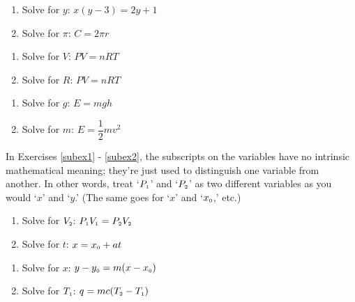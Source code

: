 \documentclass[11pt]{article}
\theoremstyle{definition}  %
\newcounter{HW}
\begin{document}
\begin{multicols}{2}
\begin{enumerate}
\setcounter{enumi}{\value{HW}}
\item Solve for $y$:  $x(y-3) = 2y+1$
\item Solve for $\pi$:  $C = 2\pi r$


\setcounter{HW}{\value{enumi}}
\end{enumerate}
\end{multicols}


\begin{multicols}{2}
\begin{enumerate}
\setcounter{enumi}{\value{HW}}
\item Solve for $V$:   $PV = nRT$
\item Solve for $R$:  $PV = nRT$
\setcounter{HW}{\value{enumi}}
\end{enumerate}
\end{multicols}

\begin{multicols}{2}
\begin{enumerate}
\setcounter{enumi}{\value{HW}}
\item Solve for $g$:   $E = mgh$ 
\item Solve for $m$:  $E = \dfrac{1}{2} mv^2$
\setcounter{HW}{\value{enumi}}
\end{enumerate}
\end{multicols}

In Exercises \ref{subex1} - \ref{subex2}, the subscripts on the variables have no intrinsic mathematical meaning; they're just used to distinguish one variable from another.  In other words, treat `$P_{\text{\tiny $1$}}$' and `$P_{\text{\tiny $2$}}$'  as two different variables as you would `$x$' and `$y$.'  (The same goes for `$x$' and `$x_{\text{\tiny $0$}}$,'  etc.)

\begin{multicols}{2}
\begin{enumerate}
\setcounter{enumi}{\value{HW}}
\item Solve for $V_{\text{\tiny $2$}}$:  $P_{\text{\tiny $1$}}V_{\text{\tiny $1$}} = P_{\text{\tiny $2$}}V_{\text{\tiny $2$}}$  \label{subex1}
\item Solve for $t$:  $x = x_{\text{\tiny $0$}} + at$ 
\setcounter{HW}{\value{enumi}}
\end{enumerate}
\end{multicols}


\begin{multicols}{2}
\begin{enumerate}
\setcounter{enumi}{\value{HW}}
\item Solve for $x$:   $y-y_{\text{\tiny $0$}} = m(x -x_{\text{\tiny $0$}})$
\item Solve for $T_{\text{\tiny $1$}}$:  $q = mc(T_{\text{\tiny $2$}} -T_{\text{\tiny $1$}})$  \label {subex2} \label{literalexlast}
\setcounter{HW}{\value{enumi}}
\end{enumerate}
\end{multicols}
\end{document}
